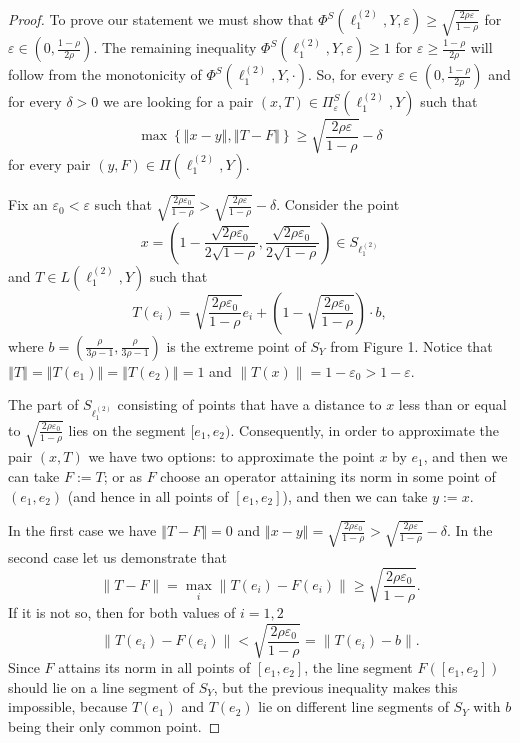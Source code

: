 \documentclass[11pt,a4paper]{amsart}
\newcommand{\eps}{\varepsilon}
\newcommand{\norm}[1]{\left\Vert#1\right\Vert}
\numberwithin{equation}{section}
\theoremstyle{plain}
\theoremstyle{definition}
\renewcommand{\geq}{\geqslant}
\begin{document}
\begin{proof}
To prove our statement we must show that $\Phi^S(\ell_1^{(2)},Y,\varepsilon)\geq \sqrt{\frac{2\rho\eps}{1-\rho}}$ for $\eps\in\left(0,\frac{1-\rho}{2\rho}\right)$. The remaining inequality $\Phi^S(\ell^{(2)}_1,Y,\varepsilon)\geq 1$ for  $\eps \geq \frac{1-\rho}{2\rho}$ will follow from the monotonicity of $\Phi^S(\ell^{(2)}_1,Y,\cdot)$. So, for every $\eps\in \left(0,\frac{1-\rho}{2\rho}\right)$ and for every $\delta > 0$ we are looking for a pair $(x, T) \in \Pi^S_\eps(\ell^{(2)}_1, Y)$ such that 
\begin{equation*}
\max\left\{ \norm{x-y}, \norm{T-F}\right\}\geq \sqrt{\frac{2\rho\eps}{1-\rho}}  - \delta
\end{equation*}
for every pair $(y, F) \in \Pi(\ell^{(2)}_1, Y)$.

Fix an $\eps_0 < \eps$ such that $\sqrt{\frac{2\rho\eps_0}{1-\rho}} > \sqrt{\frac{2\rho\eps}{1-\rho}} - \delta$. Consider the point 
$$x=\left(1-\frac{\sqrt{2\rho\eps_0}}{2\sqrt{1-\rho}}, \frac{\sqrt{2\rho\eps_0}}{2\sqrt{1-\rho}} \right)\in S_{\ell_1^{(2)}}$$
 and $T\in L(\ell_1^{(2)},Y)$ such that 
 $$T(e_i)=\sqrt{\frac{2\rho\eps_0}{1-\rho}}e_i+\left(1-\sqrt{\frac{2\rho\eps_0}{1-\rho}}\right)\cdot b,$$ 
 where $b=\left(\frac{\rho}{3\rho-1}, \frac{\rho}{3\rho-1}\right)$ is the  extreme point of $S_Y$ from Figure 1.
 Notice that $\norm{T} = \norm{T(e_1)} = \norm{T(e_2)} = 1$ and $\|T(x)\|=1-\eps_0> 1-\eps$. 
 
The part of $S_{\ell_1^{(2)}}$ consisting of points that have a distance to $x$ less than or equal to $\sqrt{\frac{2\rho\eps_0}{1-\rho}}$ lies on the segment $[e_1, e_2)$. Consequently, in order to approximate the pair $(x,T)$ we have two options: to approximate the point $x$ by $e_1$, and then we can take $F:=T$; or as  $F$ choose an operator attaining its norm in some point of  $(e_1, e_2)$ (and hence in all points of  $[e_1, e_2]$), and then we can take $y:=x$. 


In the first case we have $\norm{T-F}=0$ and $\norm{x-y}=\sqrt{\frac{2\rho\eps_0}{1-\rho}}> \sqrt{\frac{2\rho\eps}{1-\rho}} - \delta$. 
In the second case let us demonstrate that 
$$\|T-F\| = \max_i \|T(e_i)-F(e_i)\|\geq \sqrt{\frac{2\rho\eps_0}{1-\rho}}.$$
If it is not so, then for both values of $i = 1, 2$
$$
\|T(e_i)-F(e_i)\|  <  \sqrt{\frac{2\rho\eps_0}{1-\rho}} = \|T(e_i) - b\| .
$$
Since  $F$ attains its norm  in all points of  $[e_1, e_2]$, the line segment  $F([e_1, e_2])$ should lie on a line segment of $S_Y$, but the previous inequality makes this impossible, because $T(e_1)$ and $T(e_2)$ lie on different line segments of   $S_Y$ with $b$ being their only common point.
\end{proof}
\end{document}
